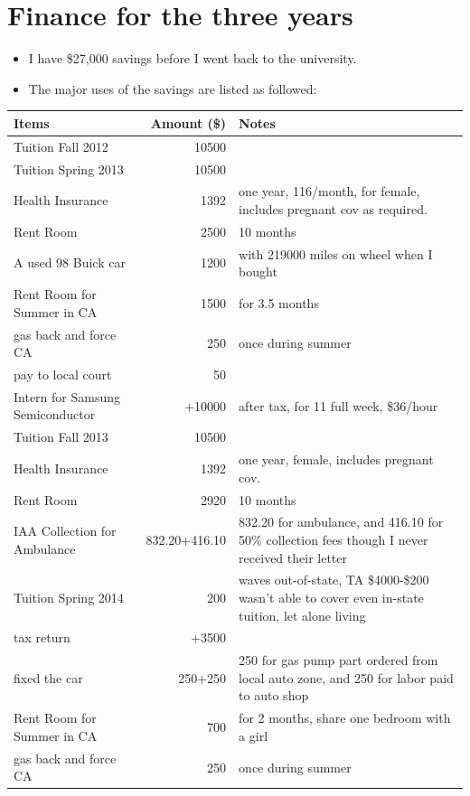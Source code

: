 \documentclass[9pt,b5paper]{article}
\begin{document}
\section{Finance for the three years}
\label{sec-7}
\begin{itemize}
\item I have \$27,000 savings before I went back to the university.
\item The major uses of the savings are listed as followed:
\end{itemize}
\begin{center}
\begin{tabular}{lrl}
\hline
Items & Amount (\$) & Notes\\
\hline
Tuition Fall 2012 & 10500 & \\
Tuition Spring 2013 & 10500 & \\
Health Insurance & 1392 & one year, 116/month, for female, includes pregnant cov as required.\\
Rent Room & 2500 & 10 months\\
A used 98 Buick car & 1200 & with 219000 miles on wheel when I bought\\
Rent Room for Summer in CA & 1500 & for 3.5 months\\
gas back and force CA & 250 & once during summer\\
pay to local court & 50 & \\
\hline
Intern for Samsung Semiconductor & +10000 & after tax, for 11 full week, \$36/hour\\
\hline
Tuition Fall 2013 & 10500 & \\
Health Insurance & 1392 & one year, female, includes pregnant cov.\\
Rent Room & 2920 & 10 months\\
IAA Collection for Ambulance & 832.20+416.10 & 832.20 for ambulance, and 416.10 for 50\% collection fees though I never received their letter\\
Tuition Spring 2014 & 200 & waves out-of-state, TA \$4000-\$200 wasn't able to cover even in-state tuition, let alone living\\
tax return & +3500 & \\
fixed the car & 250+250 & 250 for gas pump part ordered from local auto zone, and 250 for labor paid to auto shop\\
Rent Room for Summer in CA & 700 & for 2 months, share one bedroom with a girl\\
gas back and force CA & 250 & once during summer\\

\end{tabular}
\end{center}
\end{document}
